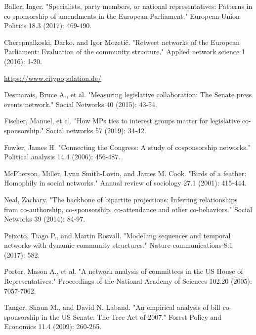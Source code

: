 \documentclass[lettersize,journal]{IEEEtran}
\begin{document}
\begin{thebibliography}{1}


Baller, Inger. "Specialists, party members, or national representatives: Patterns in co-sponsorship of amendments in the European Parliament." European Union Politics 18.3 (2017): 469-490.

Cherepnalkoski, Darko, and Igor Mozetič. "Retweet networks of the European Parliament: Evaluation of the community structure." Applied network science 1 (2016): 1-20.

\url{https://www.citypopulation.de/}

Desmarais, Bruce A., et al. "Measuring legislative collaboration: The Senate press events network." Social Networks 40 (2015): 43-54.

Fischer, Manuel, et al. "How MPs ties to interest groups matter for legislative co-sponsorship." Social networks 57 (2019): 34-42.

Fowler, James H. "Connecting the Congress: A study of cosponsorship networks." Political analysis 14.4 (2006): 456-487.

McPherson, Miller, Lynn Smith-Lovin, and James M. Cook. "Birds of a feather: Homophily in social networks." Annual review of sociology 27.1 (2001): 415-444.

Neal, Zachary. "The backbone of bipartite projections: Inferring relationships from co-authorship, co-sponsorship, co-attendance and other co-behaviors." Social Networks 39 (2014): 84-97.

Peixoto, Tiago P., and Martin Rosvall. "Modelling sequences and temporal networks with dynamic community structures." Nature communications 8.1 (2017): 582.

Porter, Mason A., et al. "A network analysis of committees in the US House of Representatives." Proceedings of the National Academy of Sciences 102.20 (2005): 7057-7062.

Tanger, Shaun M., and David N. Laband. "An empirical analysis of bill co-sponsorship in the US Senate: The Tree Act of 2007." Forest Policy and Economics 11.4 (2009): 260-265.

\end{thebibliography}


\vfill
\end{document}
